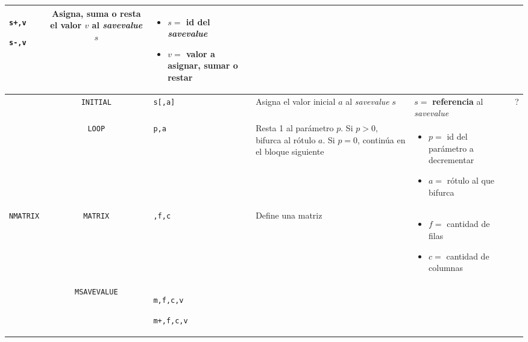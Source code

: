 \documentclass[12pt,a4paper, twoside]{paquetes-apunte/apunte}
\providecommand{\tabularnewline}{\\}
\begin{document}
\begin{longtable}{|lc>{\raggedright}p{3cm}|>{\raggedright}p{5cm}|>{\raggedright}p{7cm}|>{\raggedright}p{4cm}|}
\texttt{s+,v}

\texttt{s-,v} & Asigna, suma o resta el valor $v$ al \emph{savevalue} $s$ & \begin{itemize}
\item $s=$ id del \emph{savevalue}
\item $v=$ valor a asignar, sumar o restar\end{itemize}
 & \tabularnewline
\hline 
 & \texttt{INITIAL} & \texttt{s{[},a{]}} & Asigna el valor inicial $a$ al \emph{savevalue} $s$ & $s=$ \textbf{referencia} al \emph{savevalue} & ?\tabularnewline
\hline 
 & \texttt{LOOP} & \texttt{p,a} & Resta 1 al parámetro $p$. Si $p>0$, bifurca al rótulo $a$. Si $p=0$,
continúa en el bloque siguiente & \begin{itemize}
\item $p=$ id del parámetro a decrementar
\item $a=$ rótulo al que bifurca\end{itemize}
 & \tabularnewline
\hline 
\texttt{NMATRIX} & \texttt{MATRIX} & \texttt{,f,c} & Define una matriz & \begin{itemize}
\item $f=$ cantidad de filas
\item $c=$ cantidad de columnas\end{itemize}
 & \tabularnewline
\hline 
 & \texttt{MSAVEVALUE} & \texttt{m,f,c,v}

\texttt{m+,f,c,v}


\end{longtable}
\end{document}
